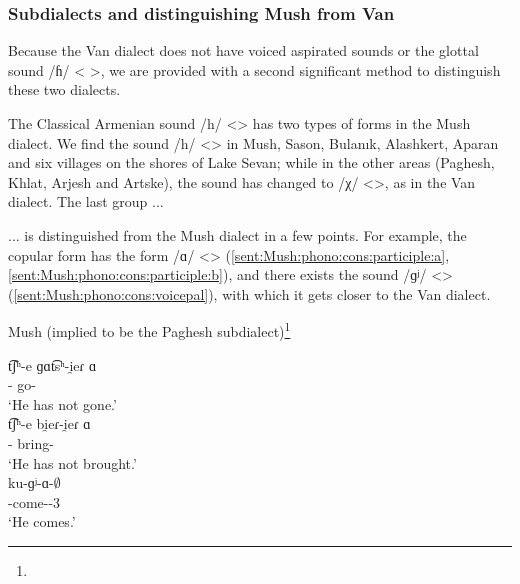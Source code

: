 \subsubsection{Subdialects and distinguishing Mush from Van}

Because the Van dialect does not have voiced aspirated sounds or the glottal sound /ɦ/ < >, we are provided with a second significant method to distinguish these two dialects. 

The Classical Armenian sound /h/ <> has two types of forms in the Mush dialect. We find the sound /h/ <> in Mush, Sason, Bulanık, Alashkert, Aparan and six villages on the shores of Lake Sevan; while in the other areas (Paghesh, Khlat, Arjesh and Artske), the sound has changed to /χ/ <>, as in the Van dialect. The last group ... 

\begin{adjarianpage}\label{page:118}\end{adjarianpage}%

... is distinguished from the Mush dialect in a few points. For example, the copular form has the form /ɑ/ <> (\ref{sent:Mush:phono:cons:participle:a}, \ref{sent:Mush:phono:cons:participle:b}), and there exists the sound /ɡʲ/ <> (\ref{sent:Mush:phono:cons:voicepal}), with which it gets closer to the Van dialect. 

\begin{exe}
	\ex Mush (implied to be the Paghesh subdialect)\footnote{}
	\begin{xlist}
		\ex \gll t͡ʃʰ-e ɡɑt͡sʰ-i̯eɾ ɑ \\
		{\neggloss}-{\aux} go-{\perfcvb} {\aux} \\
		\trans `He has not gone.'\label{sent:Mush:phono:cons:participle:a} \\
		\ex \gll t͡ʃʰ-e bi̯eɾ-i̯eɾ ɑ \\
		{\neggloss}-{\aux} bring-{\perfcvb} {\aux} \\
		\trans `He has not brought.' \label{sent:Mush:phono:cons:participle:b} \\
		\ex \gll ku-ɡʲ-ɑ-$\emptyset$ \\
		{\ind}-come-{\thgloss}-3{\sg}\\
		\trans `He comes.' \label{sent:Mush:phono:cons:voicepal}\\
	\end{xlist}
\end{exe}

